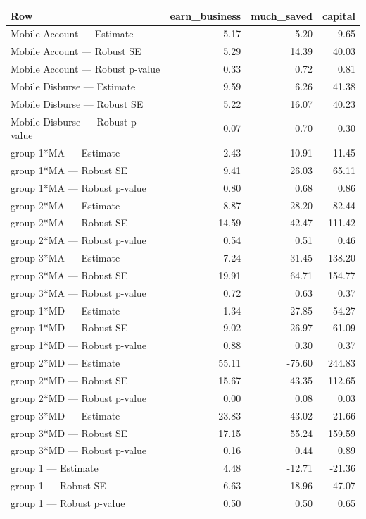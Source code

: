 
\begin{tabular}{lrrr}
\toprule
Row & earn\_business & much\_saved & capital\\
\midrule
Mobile Account — Estimate & 5.17 & -5.20 & 9.65\\
Mobile Account — Robust SE & 5.29 & 14.39 & 40.03\\
Mobile Account — Robust p-value & 0.33 & 0.72 & 0.81\\
Mobile Disburse — Estimate & 9.59 & 6.26 & 41.38\\
Mobile Disburse — Robust SE & 5.22 & 16.07 & 40.23\\
\addlinespace
Mobile Disburse — Robust p-value & 0.07 & 0.70 & 0.30\\
group 1*MA — Estimate & 2.43 & 10.91 & 11.45\\
group 1*MA — Robust SE & 9.41 & 26.03 & 65.11\\
group 1*MA — Robust p-value & 0.80 & 0.68 & 0.86\\
group 2*MA — Estimate & 8.87 & -28.20 & 82.44\\
\addlinespace
group 2*MA — Robust SE & 14.59 & 42.47 & 111.42\\
group 2*MA — Robust p-value & 0.54 & 0.51 & 0.46\\
group 3*MA — Estimate & 7.24 & 31.45 & -138.20\\
group 3*MA — Robust SE & 19.91 & 64.71 & 154.77\\
group 3*MA — Robust p-value & 0.72 & 0.63 & 0.37\\
\addlinespace
group 1*MD — Estimate & -1.34 & 27.85 & -54.27\\
group 1*MD — Robust SE & 9.02 & 26.97 & 61.09\\
group 1*MD — Robust p-value & 0.88 & 0.30 & 0.37\\
group 2*MD — Estimate & 55.11 & -75.60 & 244.83\\
group 2*MD — Robust SE & 15.67 & 43.35 & 112.65\\
\addlinespace
group 2*MD — Robust p-value & 0.00 & 0.08 & 0.03\\
group 3*MD — Estimate & 23.83 & -43.02 & 21.66\\
group 3*MD — Robust SE & 17.15 & 55.24 & 159.59\\
group 3*MD — Robust p-value & 0.16 & 0.44 & 0.89\\
group 1 — Estimate & 4.48 & -12.71 & -21.36\\
\addlinespace
group 1 — Robust SE & 6.63 & 18.96 & 47.07\\
group 1 — Robust p-value & 0.50 & 0.50 & 0.65\\

\end{tabular}
